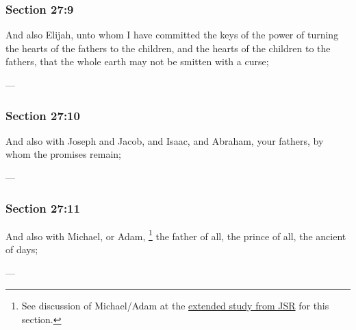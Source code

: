 	\subsubsection{Section 27:9} %
		\label{DC27-9}

		And also Elijah, unto whom I have committed the keys of the power of turning the hearts of the fathers to the children, and the hearts of the children to the fathers, that the whole earth may not be smitten with a curse;

		\begin{framed}
		\scriptsize
			\begin{compactdesc}
				\item[JSP] ---
			\end{compactdesc}
		\end{framed}

	\subsubsection{Section 27:10} %
		\label{DC27-10}

		And also with Joseph and Jacob, and Isaac, and Abraham, your fathers, by whom the promises remain;

		\begin{framed}
		\scriptsize
			\begin{compactdesc}
				\item[JSP] ---
			\end{compactdesc}
		\end{framed}

	\subsubsection{Section 27:11} %
		\label{DC27-11}

		And also with Michael, or Adam,%
			\footnote{%
				See discussion of Michael/Adam at the \hyperref[EXSS-DC27-JSR]{extended study from JSR} for this section.
				}
		the father of all, the prince of all, the ancient of days;

		\begin{framed}
		\scriptsize
			\begin{compactdesc}
				\item[JSP] ---
			\end{compactdesc}
		\end{framed}

